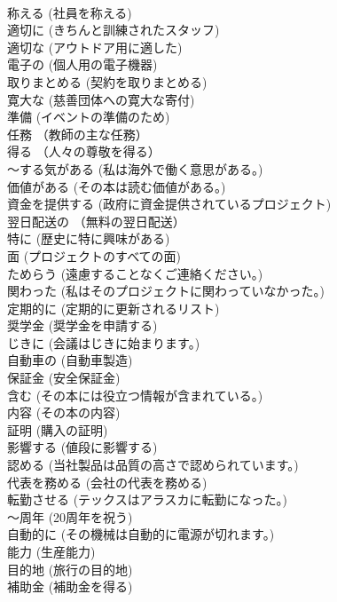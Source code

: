 \documentclass[8pt]{extreport}
\begin{document}
\begin{CJK}{UTF8}{min}
\\	称える	(社員を称える)		
\\	適切に	(きちんと訓練されたスタッフ)		
\\	適切な	(アウトドア用に適した)		
\\	電子の	(個人用の電子機器)		
\\	取りまとめる	(契約を取りまとめる)		
\\	寛大な	(慈善団体への寛大な寄付)		
\\	準備	(イベントの準備のため)		
\\	任務	（教師の主な任務）		
\\	得る	（人々の尊敬を得る）		
\\	～する気がある	(私は海外で働く意思がある。)		
\\	価値がある	(その本は読む価値がある。)		
\\	資金を提供する	(政府に資金提供されているプロジェクト)		
\\	翌日配送の	（無料の翌日配送）		
\\	特に	(歴史に特に興味がある)		
\\	面	(プロジェクトのすべての面)		
\\	ためらう	(遠慮することなくご連絡ください。)		
\\	関わった	(私はそのプロジェクトに関わっていなかった。)		
\\	定期的に	(定期的に更新されるリスト)		
\\	奨学金	(奨学金を申請する)		
\\	じきに	(会議はじきに始まります。)		
\\	自動車の	(自動車製造)		
\\	保証金	(安全保証金)		
\\	含む	(その本には役立つ情報が含まれている。)		
\\	内容	(その本の内容)		
\\	証明	(購入の証明)		
\\	影響する	(値段に影響する)		
\\	認める	(当社製品は品質の高さで認められています。)		
\\	代表を務める	(会社の代表を務める)		
\\	転勤させる	(テックスはアラスカに転勤になった。)		
\\	～周年	(20周年を祝う)		
\\	自動的に	(その機械は自動的に電源が切れます。)		
\\	能力	(生産能力)		
\\	目的地	(旅行の目的地)		
\\	補助金	(補助金を得る)		

\end{CJK}
\end{document}
